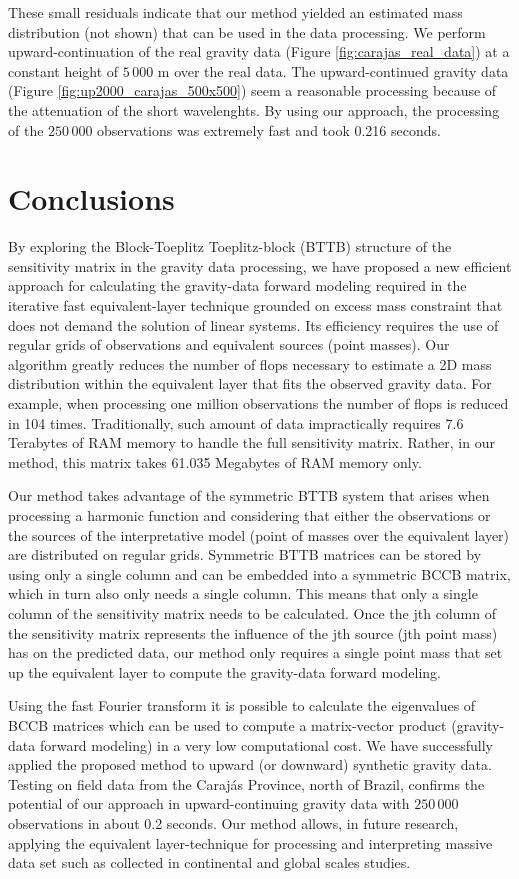 \documentclass[manuscript,revised]{geophysics}
\begin{document}
These small residuals indicate that our method yielded an estimated mass distribution (not shown) that can be used in the data processing. We perform upward-continuation of the real gravity data (Figure \ref{fig:carajas_real_data}) at a constant height of $5\,000$ m over the real data. The upward-continued gravity data (Figure \ref{fig:up2000_carajas_500x500}) seem a reasonable processing because of the attenuation of the short wavelenghts. By using our approach, the processing of the $250\,000$ observations was extremely fast and took 0.216 seconds.


\section{Conclusions}
By exploring the Block-Toeplitz Toeplitz-block (BTTB) structure of the sensitivity matrix in the gravity data processing, we have proposed a new efficient approach for calculating the gravity-data forward modeling required in the iterative fast equivalent-layer technique grounded on excess mass constraint that does not demand  the solution of linear systems.  Its efficiency requires the use of regular grids of observations and equivalent sources (point masses). Our algorithm greatly reduces the number of  flops necessary to estimate a 2D mass distribution within the equivalent layer that fits the observed gravity data. For example, when processing one million observations the number of flops is reduced in 104 times. Traditionally, such amount of data impractically requires 7.6 Terabytes of RAM memory to handle the full sensitivity matrix. Rather, in our method, this matrix takes 61.035 Megabytes of RAM memory only.

Our method takes advantage of the symmetric BTTB system that arises when processing a harmonic function and considering that either the observations or the sources of the interpretative model (point of masses over the equivalent layer) are distributed on regular grids. Symmetric BTTB matrices can be stored by using only a single column and can be embedded into a symmetric BCCB matrix, which in turn also only needs a single column. 
This means that only a single column  of the sensitivity matrix needs to be calculated.  Once the jth column of the sensitivity matrix represents the influence of the jth source (jth point mass) has on the predicted data, our method only requires a single point mass that set up the equivalent layer to compute the gravity-data forward modeling.

Using the fast Fourier transform it is possible to calculate the eigenvalues of BCCB matrices which can
be used to compute a matrix-vector product (gravity-data forward modeling) in a very low computational cost. We have successfully applied the proposed method to upward (or downward) synthetic gravity data. Testing on field data from the Caraj\'as Province, north of Brazil, confirms the potential of our approach in upward-continuing  gravity data with $250\,000$ observations in  about 0.2 seconds.  Our method allows, in future research, applying the equivalent layer-technique for processing and interpreting massive data set such as collected in continental and global scales studies.
\end{document}
